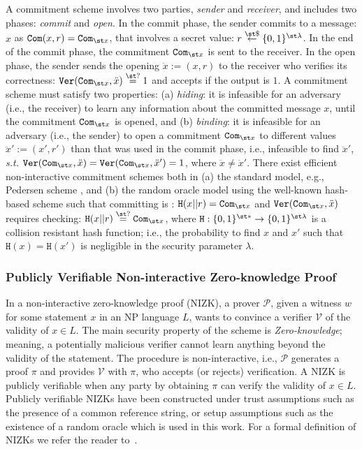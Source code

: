  A commitment scheme involves two parties,  \emph{sender} and  \emph{receiver}, and includes  two phases: \emph{commit} and  \emph{open}. In the commit phase, the sender  commits to a message: $x$ as $\mathtt{Com}(x,r)=\mathtt{Com}_{\st x}$, that involves a secret value: $r\stackrel{\st\$}\leftarrow \{0,1\}^{\st\lambda}$. In the end of the commit phase,  the commitment $\mathtt{Com}_{\st x}$ is sent to the receiver. In the open phase, the sender sends the opening $\ddot{x}:=(x,r)$ to the receiver who verifies its correctness: $\mathtt{Ver}(\mathtt{Com}_{\st x},\ddot{x})\stackrel{\st ?}=1$ and accepts if the output is $1$.  A commitment scheme must satisfy two properties: (a) \textit{hiding}: it is infeasible for an adversary (i.e., the receiver) to learn any information about the committed  message $x$, until the commitment $\mathtt{Com}_{\st x}$ is opened, and (b) \textit{binding}: it is infeasible for an adversary (i.e., the sender) to open a commitment $\mathtt{Com}_{\st x}$ to different values $\ddot{x}':=(x',r')$ than that was  used in the commit phase, i.e., infeasible to find  $\ddot{x}'$, \textit{s.t.} $\mathtt{Ver}(\mathtt{Com}_{\st x},\ddot{x})=\mathtt{Ver}(\mathtt{Com}_{\st x},\ddot{x}')=1$, where $\ddot{x}\neq \ddot{x}'$.  There exist efficient non-interactive  commitment schemes both in (a) the standard model, e.g., Pedersen scheme \cite{Pedersen91}, and (b)  the random oracle model using the well-known hash-based scheme such that committing  is : $\mathtt{H}(x||r)=\mathtt{Com}_{\st x}$ and $\mathtt{Ver}(\mathtt{Com}_{\st x},\ddot{x})$ requires checking: $\mathtt{H}(x||r)\stackrel{\st ?}=\mathtt{Com}_{\st x}$, where $\mathtt{H}:\{0,1\}^{\st *}\rightarrow \{0,1\}^{\st\lambda}$ is a collision resistant hash function; i.e., the probability to find $x$ and $x'$ such that $\mathtt{H}(x)=\mathtt{H}(x')$ is negligible in the security parameter $\lambda$.
 
 
\subsubsection{Publicly Verifiable Non-interactive Zero-knowledge Proof}\label{subsec:PV-NIZK}

In a non-interactive zero-knowledge proof (NIZK), a prover $\mathcal{P}$, given a witness $w$ for some statement $x$ in an NP language $L$, wants to convince a verifier $\mathcal{V}$ of the validity of $x\in L$. The main security property of the scheme is \emph{Zero-knowledge}; meaning,   a potentially malicious verifier  cannot learn anything beyond the validity of the statement.  The procedure is non-interactive, i.e., $\mathcal{P}$ generates a proof $\pi$ and provides $\mathcal{V}$ with $\pi$, who accepts (or rejects) verification. A NIZK is publicly verifiable when any party by obtaining $\pi$ can verify the validity of $x\in L$. Publicly verifiable NIZKs have been constructed under trust assumptions such as the presence of a common reference string, or setup assumptions such as the existence of a random oracle which is used in this work. For a formal definition of NIZKs we refer the reader to~\cite{DBLP:books/cu/Goldreich2001}. 
 
